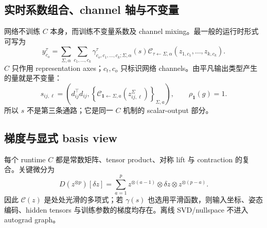 \documentclass[11pt,a4paper,fontset=fandol]{ctexart}
\newcommand{\Hom}{\operatorname{Hom}}
\newcommand{\one}{\mathbf 1}
\begin{document}
\begin{center}
\end{center}

\subsection{实时系数组合、channel 轴与不变量}

网络不训练 $C$ 本身，而训练不变量系数及 channel mixing。最一般的运行时形式可写为
\begin{equation}
  y_{c_o}^{\tau}
  =\sum_{\Sigma,\alpha}
   \sum_{c_1,\ldots,c_k}
  \gamma_{c_o,c_1,\ldots,c_k;\Sigma,\alpha}^{\tau}(s)
  \mathcal C_{\tau\leftarrow\Sigma,\alpha}
  (z_{1,c_1},\ldots,z_{k,c_k}).
  \label{eq:channel-c}
\end{equation}
$C$ 只作用 representation axes；$c_t,c_o$ 只标识网络 channels。由平凡输出类型产生的量就是不变量：
\begin{equation}
  s_{ij,\ell}
  =\left(
    d_{ij}^\top d_{ij},
    \left\{
    \mathcal C_{\one\leftarrow\Sigma,a}
    (z_{ij,\ell}^{\Sigma})
    \right\}_{\Sigma,a}
  \right),
  \qquad \rho_\one(g)=1.
  \label{eq:invariants}
\end{equation}
所以 $s$ 不是第三条通路；它是同一 $C$ 机制的 scalar-output 部分。

\subsection{梯度与显式 basis view}

每个 runtime $C$ 都是常数矩阵、tensor product、对称 lift 与 contraction 的复合。关键微分为
\begin{equation}
  D(z^{\otimes p})[\delta z]
  =\sum_{a=1}^{p}
  z^{\otimes(a-1)}\otimes\delta z\otimes z^{\otimes(p-a)}.
  \label{eq:tensor-gradient}
\end{equation}
因此 $\mathcal C(z)$ 是处处光滑的多项式；若 $\gamma(s)$ 也选用平滑函数，则输入坐标、姿态编码、hidden tensors 与训练参数的梯度均存在。离线 SVD/nullspace 不进入 autograd graph。
\end{document}
